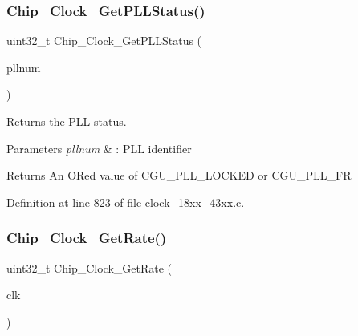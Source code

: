 \mbox{\label{group___c_l_o_c_k__18_x_x__43_x_x_gad2a40b92ab5d064cc655ae4ada1474b0}} 
\subsubsection{\texorpdfstring{Chip\+\_\+\+Clock\+\_\+\+Get\+P\+L\+L\+Status()}{Chip\_Clock\_GetPLLStatus()}}
{\footnotesize\ttfamily uint32\+\_\+t Chip\+\_\+\+Clock\+\_\+\+Get\+P\+L\+L\+Status (\begin{DoxyParamCaption}\item[{\hyperlink{group___c_l_o_c_k__18_x_x__43_x_x_ga839a458a9e1e2a85e68470156c861e6a}{C\+H\+I\+P\+\_\+\+C\+G\+U\+\_\+\+U\+S\+B\+\_\+\+A\+U\+D\+I\+O\+\_\+\+P\+L\+L\+\_\+T}}]{pllnum }\end{DoxyParamCaption})}



Returns the P\+LL status. 


\begin{DoxyParams}{Parameters}
{\em pllnum} & \+: P\+LL identifier \\
\hline
\end{DoxyParams}
\begin{DoxyReturn}{Returns}
An OR\textquotesingle{}ed value of C\+G\+U\+\_\+\+P\+L\+L\+\_\+\+L\+O\+C\+K\+ED or C\+G\+U\+\_\+\+P\+L\+L\+\_\+\+FR 
\end{DoxyReturn}


Definition at line 823 of file clock\+\_\+18xx\+\_\+43xx.\+c.

\mbox{\label{group___c_l_o_c_k__18_x_x__43_x_x_gafb964074c3fa133e29c51bd31e4590ae}} 
\subsubsection{\texorpdfstring{Chip\+\_\+\+Clock\+\_\+\+Get\+Rate()}{Chip\_Clock\_GetRate()}}
{\footnotesize\ttfamily uint32\+\_\+t Chip\+\_\+\+Clock\+\_\+\+Get\+Rate (\begin{DoxyParamCaption}\item[{\hyperlink{chip__clocks_8h_a45bb23228b9831321626c103ada7c60b}{C\+H\+I\+P\+\_\+\+C\+C\+U\+\_\+\+C\+L\+K\+\_\+T}}]{clk }\end{DoxyParamCaption})}



